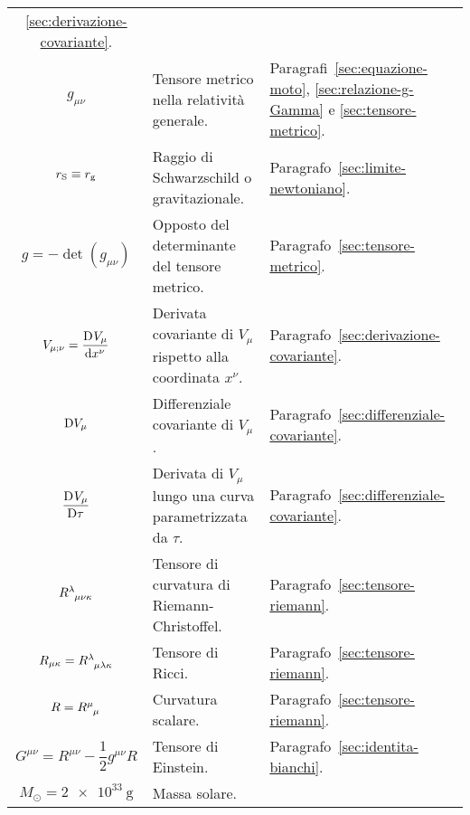 \begin{longtable}{c
    p{}
    p{}}
  \ref{sec:derivazione-covariante}. \\
  $g_{\mu\nu}$ & Tensore metrico nella relatività generale. &
  Paragrafi~\ref{sec:equazione-moto}, \ref{sec:relazione-g-Gamma} e
  \ref{sec:tensore-metrico}. \\
  $r_{\textup{S}} \equiv r_{\textup{g}}$ & Raggio di Schwarzschild o
  gravitazionale. &
  Paragrafo~\ref{sec:limite-newtoniano}. \\[1.6ex]
  $g = -\det(g_{\mu\nu})$ & Opposto del determinante del tensore metrico. &
  Paragrafo~\ref{sec:tensore-metrico}. \\
  $V_{\mu;\nu} = \displaystyle\frac{{\mathop{}\!\mathrm{D}^{}}V_{\mu}}{\mathop{}\!\mathrm{d} {x^{\nu}}^{}}$ & Derivata covariante
  di $V_{\mu}$ rispetto alla coordinata $x^{\nu}$. &
  Paragrafo~\ref{sec:derivazione-covariante}. \\
  $\mathop{}\!\mathrm{D} V_{\mu}$ & Differenziale covariante di $V_{\mu}$. &
  Paragrafo~\ref{sec:differenziale-covariante}. \\[1.6ex]
  $\displaystyle\frac{{\mathop{}\!\mathrm{D}^{}}V_{\mu}}{\mathop{}\!\mathrm{D} \tau^{}}$ & Derivata di $V_{\mu}$ lungo una curva
  parametrizzata da $\tau$. & Paragrafo~\ref{sec:differenziale-covariante}. \\
  $\tensor{R}{^{\lambda}_{\mu\nu\kappa}}$ & Tensore di curvatura di
  Riemann-Christoffel. & Paragrafo~\ref{sec:tensore-riemann}. \\
  $R_{\mu\kappa} = \tensor{R}{^{\lambda}_{\mu\lambda\kappa}}$ & Tensore di
  Ricci. & Paragrafo~\ref{sec:tensore-riemann}. \\[1.6ex]
  $R = \tensor{R}{^{\mu}_{\mu}}$ & Curvatura scalare. &
  Paragrafo~\ref{sec:tensore-riemann}. \\[1.6ex]
  $G^{\mu\nu} = R^{\mu\nu} - \dfrac{1}{2} g^{\mu\nu}R$ & Tensore di Einstein. &
  Paragrafo~\ref{sec:identita-bianchi}. \\[1.6ex]
  $M_{\odot} = \SI{2e33}{\gram}$ & Massa solare. & \\
\end{longtable}


